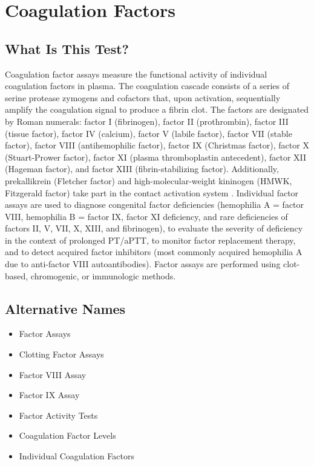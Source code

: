 \chapter{Coagulation Factors}

\section*{What Is This Test?}
Coagulation factor assays measure the functional activity of individual coagulation factors in plasma. The coagulation cascade consists of a series of serine protease zymogens and cofactors that, upon activation, sequentially amplify the coagulation signal to produce a fibrin clot. The factors are designated by Roman numerals: factor I (fibrinogen), factor II (prothrombin), factor III (tissue factor), factor IV (calcium), factor V (labile factor), factor VII (stable factor), factor VIII (antihemophilic factor), factor IX (Christmas factor), factor X (Stuart-Prower factor), factor XI (plasma thromboplastin antecedent), factor XII (Hageman factor), and factor XIII (fibrin-stabilizing factor). Additionally, prekallikrein (Fletcher factor) and high-molecular-weight kininogen (HMWK, Fitzgerald factor) take part in the contact activation system \cite{kaushansky2021williams,tierney2023current}. Individual factor assays are used to diagnose congenital factor deficiencies (hemophilia A = factor VIII, hemophilia B = factor IX, factor XI deficiency, and rare deficiencies of factors II, V, VII, X, XIII, and fibrinogen), to evaluate the severity of deficiency in the context of prolonged PT/aPTT, to monitor factor replacement therapy, and to detect acquired factor inhibitors (most commonly acquired hemophilia A due to anti-factor VIII autoantibodies). Factor assays are performed using clot-based, chromogenic, or immunologic methods.

\section*{Alternative Names}
\begin{itemize}
  \item Factor Assays
  \item Clotting Factor Assays
  \item Factor VIII Assay
  \item Factor IX Assay
  \item Factor Activity Tests
  \item Coagulation Factor Levels
  \item Individual Coagulation Factors
\end{itemize}
